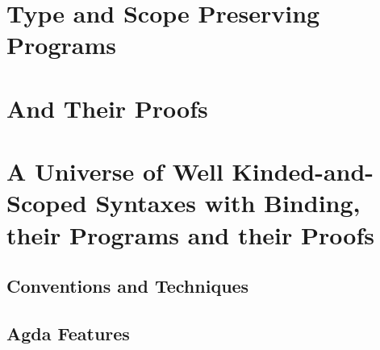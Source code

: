 \documentclass[11pt]{memoir}
\begin{document}
\frontmatter



\mainmatter
\pagestyle{ruled}
\begin{KeepFromToc}
\tableofcontents
\end{KeepFromToc}



%




\part{Type and Scope Preserving Programs}
\label{type-scope-semantics}






\part{And Their Proofs}
\label{properties}





\part{A Universe of Well Kinded-and-Scoped Syntaxes with Binding, their Programs and their Proofs}
\label{a-universe}













\cleardoublepage{}


\appendix

\chapter{Conventions and Techniques}\label{sec:conventions}
\allconventions
\alltechniques

\chapter{Agda Features}\label{sec:features}
\allfeatures

\clearpage
\listoffigures

\end{document}
